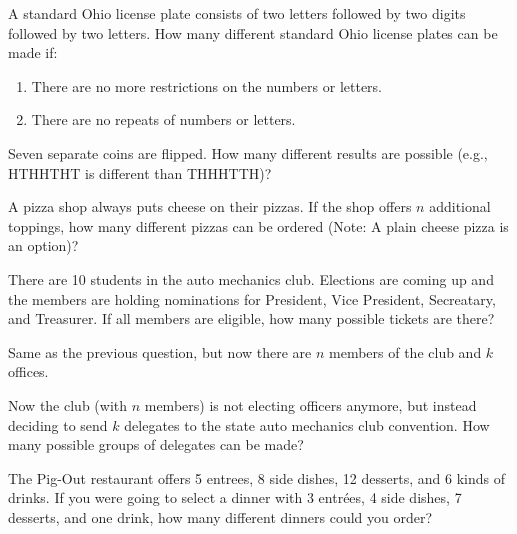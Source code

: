 \begin{prob}
A standard Ohio license plate consists of two letters followed by two
digits followed by two letters.  How many different standard Ohio
license plates can be made if: 
\begin{enumerate}
\item There are no more restrictions on the
numbers or letters.
\item  There are no repeats of numbers or letters.
\end{enumerate}
\end{prob}

\begin{prob}
Seven separate coins are flipped.  How many different results are
possible (e.g., HTHHTHT is different than THHHTTH)?
\end{prob}


\begin{prob}
A pizza shop always puts cheese on their pizzas.  If the shop offers
$n$ additional toppings, how many different pizzas can be ordered
(Note: A plain cheese pizza is an option)?
\end{prob}

\begin{prob}
There are 10 students in the auto mechanics club.  Elections are
coming up and the members are holding nominations for President, Vice
President, Secreatary, and Treasurer.  If all members are eligible,
how many possible tickets are there?
\end{prob}

\begin{prob}
Same as the previous question, but now there are $n$ members of the club
and $k$ offices.
\end{prob}


\begin{prob}
Now the club (with $n$ members) is not electing officers anymore, but
instead deciding to send $k$ delegates to the state auto mechanics
club convention.  How many possible groups of delegates can be made?
\end{prob}

\begin{prob}
The Pig-Out restaurant offers 5 entrees, 8 side dishes, 12 desserts,
and 6 kinds of drinks.  If you were going to select a dinner with 3
entr\'ees, 4 side dishes, 7 desserts, and one drink, how many
different dinners could you order?
\end{prob}
